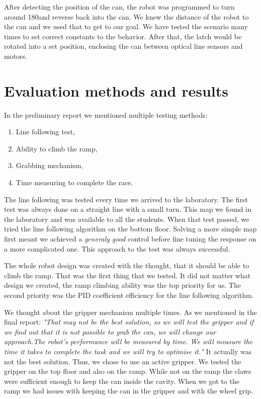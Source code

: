 \documentclass{article}
\begin{document}
After detecting the position of the can, the robot was programmed to turn around 180\textdegree and reverse back into
the can. We knew the distance of the robot to the can and we used that to get to our goal. We have tested the scenario
many times to set correct constants to the behavior. After that, the latch would be rotated into a set position,
enclosing the can between optical line sensors and motors.

\section{Evaluation methods and results}
\label{sec:evaluation_methods_and_results}

In the preliminary report we mentioned multiple testing methods:

\begin{enumerate}
	\item Line following test,
	\item Ability to climb the ramp,
	\item Grabbing mechanism,
	\item Time measuring to complete the race.
\end{enumerate}

The line following was tested every time we arrived to the laboratory. The first test was always done on a straight line
with a small turn. This map we found in the laboratory and was available to all the students. When that test passed, we
tried the line following algorithm on the bottom floor. Solving a more simple map first meant we achieved a
\textit{generaly good} control before fine tuning the response on a more complicated one. This approach to the test was
always successful.

The whole robot design was created with the thought, that it should be able to climb the ramp. That was the first thing
that we tested. It did not matter what design we created, the ramp climbing ability was the top priority for us. The
second priority was the PID coefficient efficiency for the line following algorithm.

We thought about the gripper mechanism multiple times. As we mentioned in the final report: \textit{"That may not be the
best solution, so we will test the gripper and if we find out that it is not possible to grab the can, we will change our
approach.The robot's performance will be measured by time.  We will measure the time it takes to complete the task and
we will try to optimise it."} It actually was not the best solution. Thus, we chose to use an active gripper.
We tested the gripper on the top floor and also on the ramp. While not on the ramp the claws were sufficient enough to
keep the can inside the cavity. When we got to the ramp we had issues with keeping the can in the gripper and with the
wheel grip.
\end{document}

